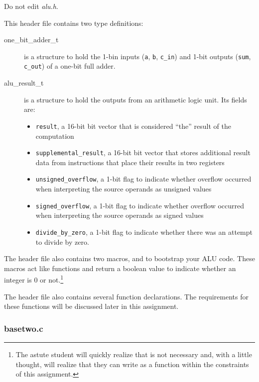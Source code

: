 Do not edit \textit{alu.h}.

This header file contains two type definitions:
\begin{description}
    \item[one\_bit\_adder\_t] is a structure to hold the 1-bin inputs (\lstinline{a}, \lstinline{b}, \lstinline{c_in}) and 1-bit outputs (\lstinline{sum}, \lstinline{c_out}) of a one-bit full adder.
    \item[alu\_result\_t] is a structure to hold the outputs from an arithmetic logic unit.
        Its fields are:
        \begin{itemize}
            \item \lstinline{result}, a 16-bit bit vector that is considered ``the'' result of the computation
            \item \lstinline{supplemental_result}, a 16-bit bit vector that stores additional result data from instructions that place their results in two registers
            \item \lstinline{unsigned_overflow}, a 1-bit flag to indicate whether overflow occurred when interpreting the source operands as unsigned values
            \item \lstinline{signed_overflow}, a 1-bit flag to indicate whether overflow occurred when interpreting the source operands as signed values
            \item \lstinline{divide_by_zero}, a 1-bit flag to indicate whether there was an attempt to divide by zero.
        \end{itemize}
\end{description}

The header file also contains two macros,  and  to bootstrap your ALU code.
These macros act like functions and return a boolean value to indicate whether an integer is 0 or not.\footnote{
    The astute student will quickly realize that  is not necessary and, with a little thought, will realize that they can write  as a function within the constraints of this assignment.}

The header file also contains several function declarations.
The requirements for these functions will be discussed later in this assignment.

\subsubsection{basetwo.c}

